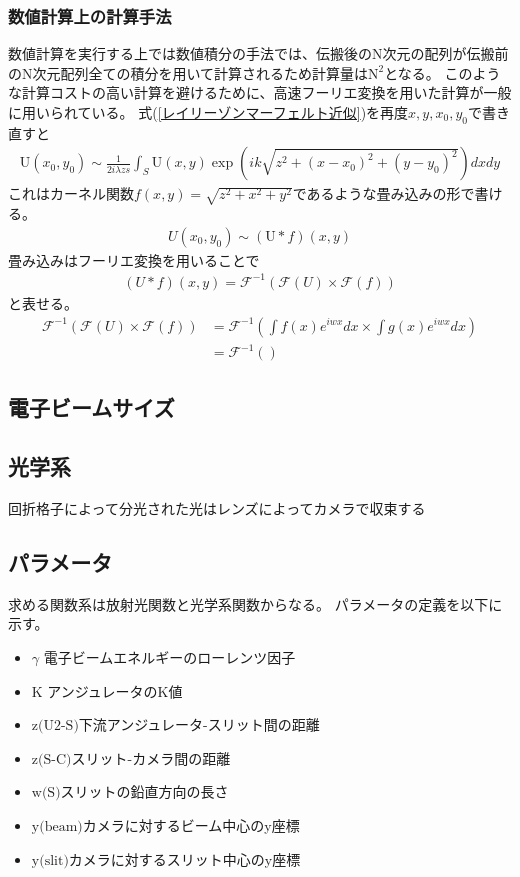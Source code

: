 \documentclass[a4paper,11pt,uplatex]{jsbook}
\begin{document}
\subsubsection{数値計算上の計算手法}
数値計算を実行する上では数値積分の手法では、伝搬後のN次元の配列が伝搬前のN次元配列全ての積分を用いて計算されるため計算量は$\text{N}^2$となる。
このような計算コストの高い計算を避けるために、高速フーリエ変換を用いた計算が一般に用いられている。
式(\ref{レイリーゾンマーフェルト近似})を再度$x,y,x_0,y_0$で書き直すと
\begin{eqnarray}
  \text{U}(x_0,y_0) \sim \frac{1}{2i\lambda zs}\int_S \text{U}(x,y) \exp( ik \sqrt{z^2 + (x-x_0)^2 + (y-y_0)^2}) dxdy
\end{eqnarray}
これはカーネル関数$f(x,y) = \sqrt{z^2 +x^2 + y^2}$であるような畳み込みの形で書ける。
\begin{eqnarray}
  U(x_0,y_0) \sim (\text{U} * f)(x,y)
\end{eqnarray}
畳み込みはフーリエ変換を用いることで
\begin{eqnarray}
  (U*f)(x,y) = \mathcal{F}^{-1}(\mathcal{F}(U) \times \mathcal{F}(f))
\end{eqnarray}
と表せる。
\begin{eqnarray}
  \mathcal{F}^{-1}(\mathcal{F}(U) \times \mathcal{F}(f)) &= \mathcal{F}^{-1} \left( \int f(x)e^{iwx}dx \times \int g(x)e^{iwx}dx \right) \\
  &= \mathcal{F}^{-1}\left( \right)
\end{eqnarray}

\subsection{電子ビームサイズ}

\subsection{光学系}
回折格子によって分光された光はレンズによってカメラで収束する

\subsection{パラメータ}
求める関数系は放射光関数と光学系関数からなる。
パラメータの定義を以下に示す。
\begin{itemize}
\item$\gamma$ 電子ビームエネルギーのローレンツ因子
\item$\text{K}$ アンジュレータのK値
\item$\text{z(U2-S)}$下流アンジュレータ-スリット間の距離
\item$\text{z(S-C)}$スリット-カメラ間の距離
\item$\text{w(S)}$スリットの鉛直方向の長さ
\item$\text{y(beam)}$カメラに対するビーム中心のy座標
\item$\text{y(slit)}$カメラに対するスリット中心のy座標
\end{itemize}
\end{document}
